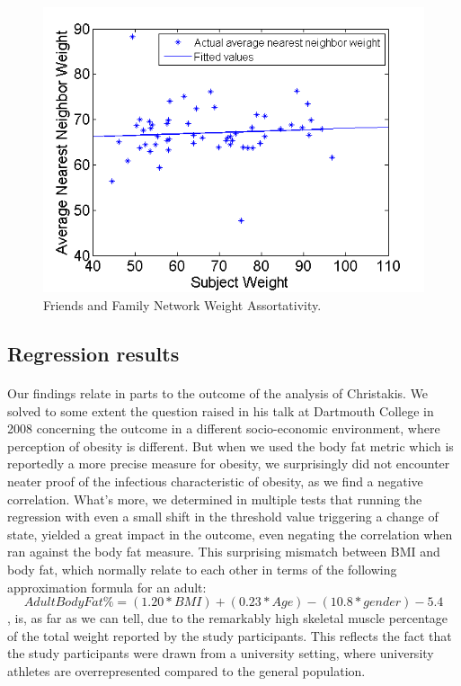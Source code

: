 \documentclass[11pt]{article}
\begin{document}
\begin{figure}[!h]
\center
   \includegraphics[scale=0.72]{weight_assortativity_figure3.png}
   \caption{\label{3} Friends and Family Network Weight Assortativity.}
\end{figure}


\subsection{Regression results}
\paragraph{}
Our findings relate in parts to the outcome of the analysis of Christakis. We solved to some extent the question raised in his talk at Dartmouth College in 2008 concerning the outcome in a different socio-economic environment, where perception of obesity is different. But when we used the body fat metric which is reportedly a more precise measure for obesity, we surprisingly did not encounter neater proof of the infectious characteristic of obesity, as we find a negative correlation. What's more, we determined in multiple tests that running the regression with even a small shift in the threshold value triggering a change of state, yielded a great impact in the outcome, even negating the correlation when ran against the body fat measure. This surprising mismatch between BMI and body fat, which normally relate to each other in terms of the following approximation formula for an adult: 
\[Adult Body Fat \% = (1.20 * BMI) + (0.23 * Age) - (10.8 * gender) - 5.4\]
, is, as far as we can tell, due to the remarkably high skeletal muscle percentage of the total weight reported by the study participants. This reflects the fact that the study participants were drawn from a university setting, where university athletes are overrepresented compared to the general population. 
\end{document}
